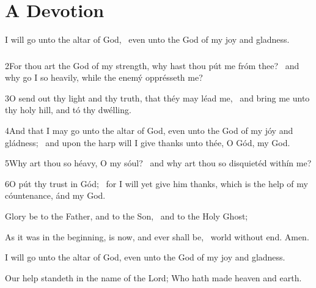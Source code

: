 
\chapter{A Devotion}

{\centering{}\par}




 I will go unto the altar of God, \star\ even unto the God of my joy and gladness.

\subsection{}


2\enspace For thou art the God of my strength, why hast thou pút me fróm thee? \star\  and why go I so heavily, while the enemý opprésseth me?

3\enspace O send out thy light and thy truth, that théy may léad me, \star\  and bring me unto thy holy hill, and tó thy dwélling.

4\enspace And that I may go unto the altar of God, even unto the God of my jóy and gládness; \star\  and upon the harp will I give thanks unto thée, O Gód, my God.

5\enspace Why art thou so héavy, O my sóul? \star\  and why art thou so disquietéd withín me?

6\enspace O pút thy trust in Gód; \star\  for I will yet give him thanks, which is the help of my cóuntenance, ánd my God.

Glory be to the Father, and to the Son, \star\  and to the Holy Ghost;

As it was in the beginning, is now, and ever shall be, \star\  world without end. Amen.

 I will go unto the altar of God, even unto the God of my joy and gladness.

\medskip

\V Our help standeth in the name of the Lord;  \R Who hath made heaven and earth.

